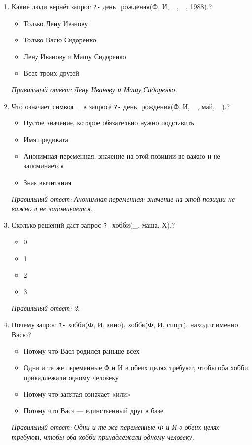 \begin{enumerate}[label=\textbf{\arabic*.}, leftmargin=0pt, itemsep=1.2em]
\item Какие люди вернёт запрос \texttt{?-} день\_рождения(Ф, И, \_, \_, 1988).?
\begin{itemize}[label=$\square$, leftmargin=1.5cm, itemsep=0.2em, topsep=0.3em]
\item Только Лену Иванову
\item Только Васю Сидоренко
\item Лену Иванову и Машу Сидоренко
\item Всех троих друзей
\end{itemize}
{\small\textit{Правильный ответ: Лену Иванову и Машу Сидоренко.}}

\item Что означает символ \_ в запросе \texttt{?-} день\_рождения(Ф, И, \_, май, \_).?
\begin{itemize}[label=$\square$, leftmargin=1.5cm, itemsep=0.2em, topsep=0.3em]
\item Пустое значение, которое обязательно нужно подставить
\item Имя предиката
\item Анонимная переменная: значение на этой позиции не важно и не запоминается
\item Знак вычитания
\end{itemize}
{\small\textit{Правильный ответ: Анонимная переменная: значение на этой позиции не важно и не запоминается.}}

\item Сколько решений даст запрос \texttt{?-} хобби(\_, маша, Х).?
\begin{itemize}[label=$\square$, leftmargin=1.5cm, itemsep=0.2em, topsep=0.3em]
\item 0
\item 1
\item 2
\item 3
\end{itemize}
{\small\textit{Правильный ответ: 2.}}

\item Почему запрос \texttt{?-} хобби(Ф, И, кино), хобби(Ф, И, спорт). находит именно Васю?
\begin{itemize}[label=$\square$, leftmargin=1.5cm, itemsep=0.2em, topsep=0.3em]
\item Потому что Вася родился раньше всех
\item Одни и те же переменные Ф и И в обеих целях требуют, чтобы оба хобби принадлежали одному человеку
\item Потому что запятая означает «или»
\item Потому что Вася — единственный друг в базе
\end{itemize}
{\small\textit{Правильный ответ: Одни и те же переменные Ф и И в обеих целях требуют, чтобы оба хобби принадлежали одному человеку.}}


\end{enumerate}
